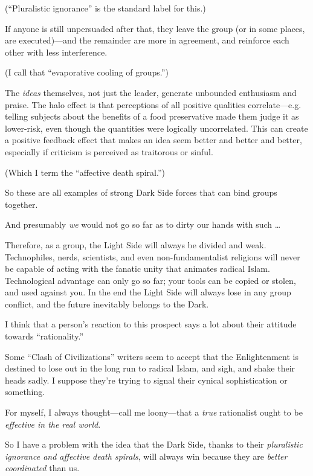 {
 (``Pluralistic ignorance'' is
the standard label for this.)}

{
 If anyone is still unpersuaded after that, they leave the group
(or in some places, are executed)---and the remainder are more in
agreement, and reinforce each other with less interference.}

{
 (I call that ``evaporative cooling of
groups.'')}

{
 The \textit{ideas} themselves, not just the leader, generate
unbounded enthusiasm and praise. The halo effect is that perceptions of
all positive qualities correlate---e.g. telling subjects about the
benefits of a food preservative made them judge it as lower-risk, even
though the quantities were logically uncorrelated. This can create a
positive feedback effect that makes an idea seem better and better and
better, especially if criticism is perceived as traitorous or sinful.}

{
 (Which I term the ``affective death
spiral.'')}

{
 So these are all examples of strong Dark Side forces that can bind
groups together.}

{
 And presumably \textit{we} would not go so far as to dirty our
hands with such \ldots}

{
 Therefore, as a group, the Light Side will always be divided and
weak. Technophiles, nerds, scientists, and even non-fundamentalist
religions will never be capable of acting with the fanatic unity that
animates radical Islam. Technological advantage can only go so far;
your tools can be copied or stolen, and used against you. In the end
the Light Side will always lose in any group conflict, and the future
inevitably belongs to the Dark.}

{
 I think that a person's reaction to this prospect
says a lot about their attitude towards
``rationality.''}

{
 Some ``Clash of Civilizations''
writers seem to accept that the Enlightenment is destined to lose out
in the long run to radical Islam, and sigh, and shake their heads
sadly. I suppose they're trying to signal their cynical
sophistication or something.}

{
 For myself, I always thought---call me loony---that a
\textit{true} rationalist ought to be \textit{effective in the real
world}.}

{
 So I have a problem with the idea that the Dark Side, thanks to
their \textit{pluralistic ignorance and affective death spirals}, will
always win because they are \textit{better coordinated} than us.}

